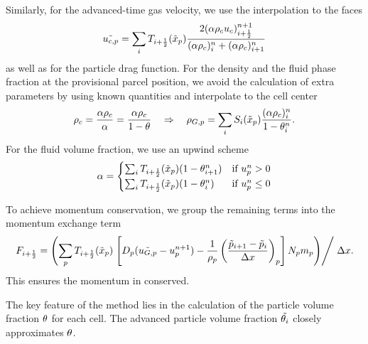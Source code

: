 Similarly, for the advanced-time gas velocity, we use the interpolation to the faces
\begin{equation}
    \tilde{u_{c,p}} = \sum_i T_{i+\frac{1}{2}} (\tilde{x}_p) \dfrac{2 (\alpha \rho_c u_c)_{i+\frac{1}{2}}^{n+1}}{(\alpha \rho_c)_i^n + (\alpha \rho_c)_{i+1}^n}
\end{equation}
as well as for the particle drag function. 
For the density and the fluid phase fraction at the provisional parcel position, we avoid the calculation of extra parameters by using known quantities and interpolate to the cell center
\begin{align}
    \rho_c = \dfrac{\alpha \rho_c}{\alpha} = \dfrac{\alpha \rho_c}{1-\theta} \quad
    \Rightarrow \quad \rho_{G,p} = \sum_i S_i (\tilde{x}_p) \dfrac{(\alpha \rho_c)_i^n}{1 - \theta_i^n}.
\end{align}
For the fluid volume fraction, we use an upwind scheme
\begin{align}
    \alpha = \begin{cases}
        \sum_i T_{i+\frac{1}{2}} (\tilde{x}_p) (1 - \theta_{i+1}^n) & \text{if } u_p^n > 0 \\
        \sum_i T_{i+\frac{1}{2}} (\tilde{x}_p) (1 - \theta_i^n) & \text{if } u_p^n \leq 0
    \end{cases}
\end{align}

To achieve momentum conservation, we group the remaining terms into the momentum exchange term
\begin{equation}
    F_{i+\frac{1}{2}} = \left( \sum_p T_{i+\frac{1}{2}} (\tilde{x}_p) \left. \left[ D_p (\tilde{u_{G,p}} - u_p^{n+1} ) - \dfrac{1}{\rho_p} \left( \dfrac{\tilde{p}_{i+1} - \tilde{p}_i}{\Delta x}\right)_p \right] N_p m_p \right) \middle / \right. \Delta x.
\end{equation}
This ensures the momentum in conserved.

The key feature of the \MP method lies in the calculation of the particle volume fraction $\theta$ for each cell. 
The advanced particle volume fraction $\tilde{\theta_i}$ closely approximates $\theta$.


